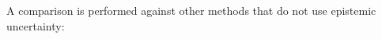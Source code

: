 \documentclass[preview]{standalone}
\begin{document}
\begin{center}
A comparison is performed against other methods 
            that do not use epistemic uncertainty:
\end{center}
\end{document}
